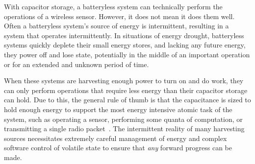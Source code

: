 With capacitor storage, 
a batteryless system can technically perform the operations of a wireless sensor. However, it does not mean it does them well.
Often a batteryless system's source of energy is intermittent, resulting in a system that operates intermittently.
In situations of energy drought, batteryless systems quickly deplete their
small energy stores, and lacking any future energy,
they power off and lose
state, potentially in the middle of an important operation or for an extended and unknown period of time.

When these systems are harvesting enough power to turn on and do work, they can only perform operations that require less energy than their capacitor storage can hold. Due to this, the general rule of thumb is that the capacitance is sized to hold enough energy to support the most energy intensive atomic task of the system, such as operating a sensor, performing some quanta of computation, or transmitting a single radio packet~\cite{nardello2019camaroptera,colinReconfigurable18, shukla2019skinnypower, hesterFlicker17}.
The intermittent reality of many harvesting sources necessitates extremely careful management of energy and complex software control of volatile state to ensure that \textit{any} forward progress can be made.

